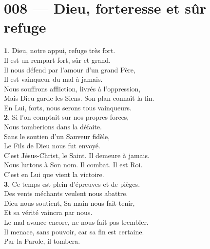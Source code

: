 \documentclass[10pt,a5paper]{article}
\begin{document}
\section*{008 — Dieu, forteresse et sûr refuge}

\textbf{1}. Dieu, notre appui, refuge très fort.\\[0.5em]
Il est un rempart fort, sûr et grand.\\[0.5em]
Il nous défend par l'amour d'un grand Père,\\[0.5em]
Il est vainqueur du mal à jamais.\\[0.5em]
Nous souffrons affliction, livrés à l'oppression,\\[0.5em]
Mais Dieu garde les Siens. Son plan connaît la fin.\\[0.5em]
En Lui, forts, nous serons tous vainqueurs.\\[1em]

\textbf{2}. Si l'on comptait sur nos propres forces,\\[0.5em]
Nous tomberions dans la défaite.\\[0.5em]
Sans le soutien d'un Sauveur fidèle,\\[0.5em]
Le Fils de Dieu nous fut envoyé.\\[0.5em]
C'est Jésus-Christ, le Saint. Il demeure à jamais.\\[0.5em]
Nous luttons à Son nom. Il combat. Il est Roi.\\[0.5em]
C'est en Lui que vient la victoire.\\[1em]

\textbf{3}. Ce temps est plein d'épreuves et de pièges.\\[0.5em]
Des vents méchants veulent nous abattre.\\[0.5em]
Dieu nous soutient, Sa main nous fait tenir,\\[0.5em]
Et sa vérité vaincra par nous.\\[0.5em]
Le mal avance encore, ne nous fait pas trembler.\\[0.5em]
Il menace, sans pouvoir, car sa fin est certaine.\\[0.5em]
Par la Parole, il tombera.
\end{document}
